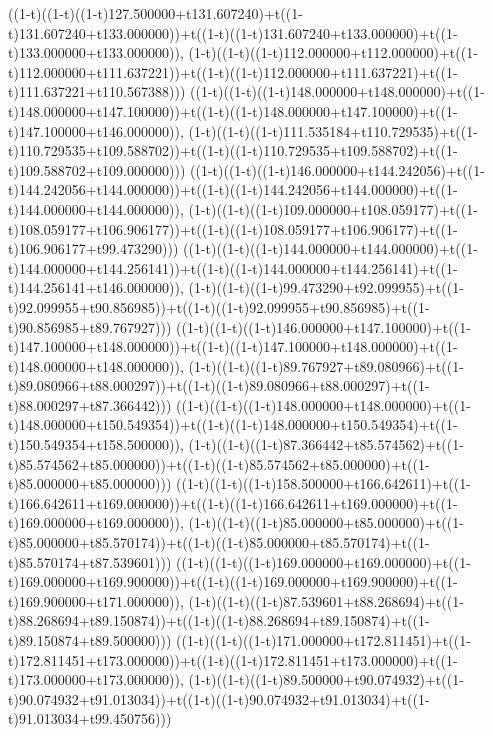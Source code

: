 ((1-t)((1-t)((1-t)127.500000+t131.607240)+t((1-t)131.607240+t133.000000))+t((1-t)((1-t)131.607240+t133.000000)+t((1-t)133.000000+t133.000000)),                                     (1-t)((1-t)((1-t)112.000000+t112.000000)+t((1-t)112.000000+t111.637221))+t((1-t)((1-t)112.000000+t111.637221)+t((1-t)111.637221+t110.567388)))
((1-t)((1-t)((1-t)148.000000+t148.000000)+t((1-t)148.000000+t147.100000))+t((1-t)((1-t)148.000000+t147.100000)+t((1-t)147.100000+t146.000000)),                                     (1-t)((1-t)((1-t)111.535184+t110.729535)+t((1-t)110.729535+t109.588702))+t((1-t)((1-t)110.729535+t109.588702)+t((1-t)109.588702+t109.000000)))
((1-t)((1-t)((1-t)146.000000+t144.242056)+t((1-t)144.242056+t144.000000))+t((1-t)((1-t)144.242056+t144.000000)+t((1-t)144.000000+t144.000000)),                                     (1-t)((1-t)((1-t)109.000000+t108.059177)+t((1-t)108.059177+t106.906177))+t((1-t)((1-t)108.059177+t106.906177)+t((1-t)106.906177+t99.473290)))
((1-t)((1-t)((1-t)144.000000+t144.000000)+t((1-t)144.000000+t144.256141))+t((1-t)((1-t)144.000000+t144.256141)+t((1-t)144.256141+t146.000000)),                                     (1-t)((1-t)((1-t)99.473290+t92.099955)+t((1-t)92.099955+t90.856985))+t((1-t)((1-t)92.099955+t90.856985)+t((1-t)90.856985+t89.767927)))
((1-t)((1-t)((1-t)146.000000+t147.100000)+t((1-t)147.100000+t148.000000))+t((1-t)((1-t)147.100000+t148.000000)+t((1-t)148.000000+t148.000000)),                                     (1-t)((1-t)((1-t)89.767927+t89.080966)+t((1-t)89.080966+t88.000297))+t((1-t)((1-t)89.080966+t88.000297)+t((1-t)88.000297+t87.366442)))
((1-t)((1-t)((1-t)148.000000+t148.000000)+t((1-t)148.000000+t150.549354))+t((1-t)((1-t)148.000000+t150.549354)+t((1-t)150.549354+t158.500000)),                                     (1-t)((1-t)((1-t)87.366442+t85.574562)+t((1-t)85.574562+t85.000000))+t((1-t)((1-t)85.574562+t85.000000)+t((1-t)85.000000+t85.000000)))
((1-t)((1-t)((1-t)158.500000+t166.642611)+t((1-t)166.642611+t169.000000))+t((1-t)((1-t)166.642611+t169.000000)+t((1-t)169.000000+t169.000000)),                                     (1-t)((1-t)((1-t)85.000000+t85.000000)+t((1-t)85.000000+t85.570174))+t((1-t)((1-t)85.000000+t85.570174)+t((1-t)85.570174+t87.539601)))
((1-t)((1-t)((1-t)169.000000+t169.000000)+t((1-t)169.000000+t169.900000))+t((1-t)((1-t)169.000000+t169.900000)+t((1-t)169.900000+t171.000000)),                                     (1-t)((1-t)((1-t)87.539601+t88.268694)+t((1-t)88.268694+t89.150874))+t((1-t)((1-t)88.268694+t89.150874)+t((1-t)89.150874+t89.500000)))
((1-t)((1-t)((1-t)171.000000+t172.811451)+t((1-t)172.811451+t173.000000))+t((1-t)((1-t)172.811451+t173.000000)+t((1-t)173.000000+t173.000000)),                                     (1-t)((1-t)((1-t)89.500000+t90.074932)+t((1-t)90.074932+t91.013034))+t((1-t)((1-t)90.074932+t91.013034)+t((1-t)91.013034+t99.450756)))
